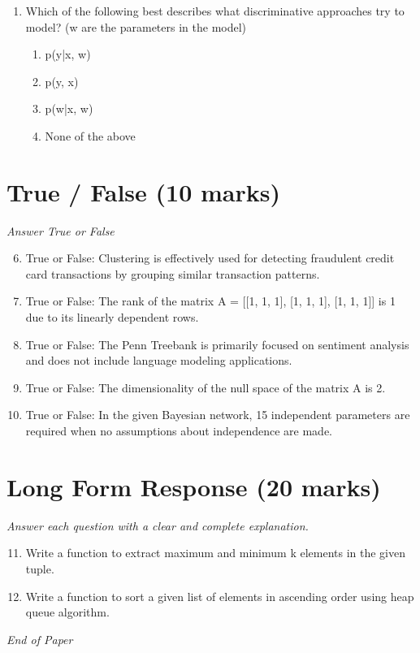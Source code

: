 \documentclass[12pt]{article}
\begin{document}
\begin{enumerate}[label=\arabic*.]
\begin{enumerate}[label=(\alph*)]
    \item P(X, Y, Z) = P(X) * P(Y|X) * P(Z|Y)
    \item P(X, Y, Z) = P(Z) * P(X|Z) * P(Y|Z)
    \item P(X, Y, Z) = P(X) * P(Y) * P(Z)
\end{enumerate}
\item Which of the following best describes what discriminative approaches try to model? (w are the parameters in the model)
\begin{enumerate}[label=(\alph*)]
    \item p(y|x, w)
    \item p(y, x)
    \item p(w|x, w)
    \item None of the above
\end{enumerate}
\end{enumerate}

\section*{True / False (10 marks)}
\textit{Answer True or False}
\begin{enumerate}[label=\arabic*.]
\setcounter{enumi}{5}
\item True or False: Clustering is effectively used for detecting fraudulent credit card transactions by grouping similar transaction patterns.
\item True or False: The rank of the matrix A = [[1, 1, 1], [1, 1, 1], [1, 1, 1]] is 1 due to its linearly dependent rows.
\item True or False: The Penn Treebank is primarily focused on sentiment analysis and does not include language modeling applications.
\item True or False: The dimensionality of the null space of the matrix A is 2.
\item True or False: In the given Bayesian network, 15 independent parameters are required when no assumptions about independence are made.
\end{enumerate}

\section*{Long Form Response (20 marks)}
\textit{Answer each question with a clear and complete explanation.}
\begin{enumerate}[label=\arabic*.]
\setcounter{enumi}{10}
\item Write a function to extract maximum and minimum k elements in the given tuple.
\item Write a function to sort a given list of elements in ascending order using heap queue algorithm.
\end{enumerate}

\vfill
\noindent\textit{End of Paper}
\end{document}
